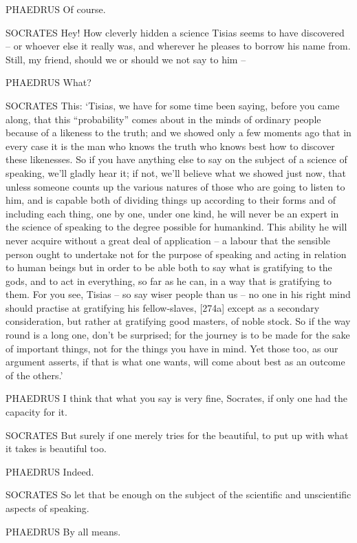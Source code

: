 PHAEDRUS Of course.

SOCRATES Hey! How cleverly hidden a science Tisias seems to have
discovered -- or whoever else it really was, and wherever he pleases to
borrow his name from.
Still, my friend, should  we or should we not say to him --

 PHAEDRUS What?

SOCRATES This: ‘Tisias, we have for some time been saying, before you
came along, that this “probability” comes about in the minds of ordinary
people because of a likeness to the truth;  and we showed only a
few moments ago that in every case it is the man who knows the truth who
knows best how to discover these likenesses. So if you have anything
else to say on the subject of a science of speaking, we'll gladly hear
it; if not, we'll believe what we showed just now, that unless someone
counts  up the various natures of those who are going to listen
to him, and is capable both of dividing
things up according to
their forms and of including each thing, one by one, under one kind, he
will never be an expert in the science of speaking to the degree
possible for humankind. This ability he will never  acquire
without a great deal of application -- a labour that the sensible person
ought to undertake not for the purpose of speaking and acting in
relation to human beings but in order to be able both to say what is
gratifying to the gods,
and to act in everything, so far as he can, in a way that is gratifying
to them. For you see, Tisias -- so say wiser people than us -- no one in
his right mind should practise at gratifying his fellow-slaves,
{[}274a{]} except as a secondary consideration, but rather at gratifying
good masters, of noble
stock. So if the way
round is a long one, don't be surprised; for the journey is to be made
for the sake of important things, not for the things you have in mind.
Yet those too, as our argument asserts, if that is what one 
wants, will come about best as an outcome of the
others.'

PHAEDRUS I think that what you say is very fine, Socrates, if only one
had the capacity for it.

SOCRATES But surely if one merely tries for the
beautiful, to put up
with what it takes is beautiful too. 

PHAEDRUS Indeed.

SOCRATES So let that be enough on the subject of the scientific and
unscientific aspects of speaking.

PHAEDRUS By all means. 

